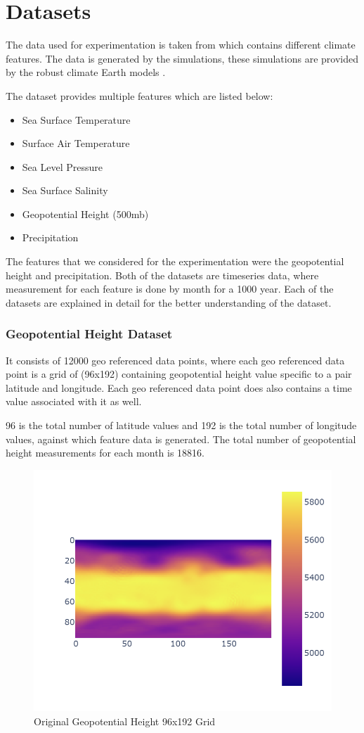 
\clearpage
\cleardoublepage

\chapter{Datasets}
\label{chap:dataset}

The data used for experimentation is taken from \cite{willi_rath_2023_7779883} which contains different climate features. The data is generated by the simulations, these simulations are provided by the robust climate Earth models \cite{willi_rath_2023_7779883}.

The dataset provides multiple features which are listed below:
\begin{itemize}
    \item Sea Surface Temperature
    \item Surface Air Temperature
    \item Sea Level Pressure
    \item Sea Surface Salinity
    \item Geopotential Height (500mb)
    \item Precipitation
\end{itemize}

The features that we considered for the experimentation were the geopotential height and precipitation.
Both of the datasets are timeseries data, where measurement for each feature is done by month for a 1000 year. Each of the datasets are explained in detail for the better understanding of the dataset.
\subsection{Geopotential Height Dataset}
It consists of 12000 geo referenced data points, where each geo referenced data point is a grid of (96x192) containing geopotential height value specific to a pair latitude and longitude.
Each geo referenced data point does also contains a time value associated with it as well.

96  is the total number of latitude values and  192 is the total number of longitude values, against which feature data is generated. The total number of geopotential height measurements for each month is 18816.

\begin{figure}[H]
    \centering
    \includegraphics[width=0.6\linewidth]{figures/chapter-5/data_original.png}
    \caption{Original Geopotential Height 96x192 Grid }
    \label{fig:org_geopoth}
\end{figure}

